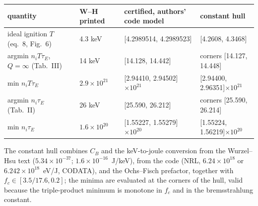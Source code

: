 \documentclass[10pt]{article}
\begin{document}
\begin{center}\small\begin{tabular}{p{3.8cm}p{2.8cm}p{4.4cm}p{3.6cm}}\toprule
quantity & W--H printed & certified, authors' code model & constant hull\\\midrule
ideal ignition $T$ (eq.~8, Fig.~6) & 4.3 keV & [4.2989514, 4.2989523] & [4.2608, 4.3468]\\
argmin $n_iT\tau_E$, $Q=\infty$ (Tab.~III) & 14 keV & [14.128, 14.442] & corners [14.127, 14.448]\\
min $n_iT\tau_E$ & $2.9\times10^{21}$ & [2.94410, 2.94502]$\times10^{21}$ & [2.94400, 2.96351]$\times10^{21}$\\
argmin $n_i\tau_E$ (Tab.~II) & 26 keV & [25.590, 26.212] & corners [25.590, 26.214]\\
min $n_i\tau_E$ & $1.6\times10^{20}$ & [1.55227, 1.55279]$\times10^{20}$ & [1.55224, 1.56219]$\times10^{20}$\\\bottomrule
\end{tabular}\end{center}
The constant hull combines $C_B$ and the keV-to-joule conversion from the Wurzel--Hsu text ($5.34\times10^{-37}$; $1.6\times10^{-16}$~J/keV), from the code (NRL, $6.24\times10^{18}$ or $6.242\times10^{18}$~eV/J, CODATA), and the Ochs--Fisch prefactor, together with $f_c\in[3.5/17.6,0.2]$; the minima are evaluated at the corners of the hull, valid because the triple-product minimum is monotone in $f_c$ and in the bremsstrahlung constant.
\end{document}
